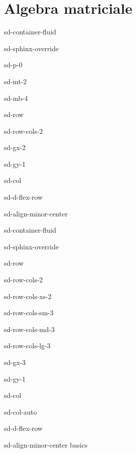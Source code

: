 \documentclass[letterpaper,10pt,italian]{jupyterBook}
\begin{document}
\chapter{Algebra matriciale}
\label{\detokenize{ch/algebra/matrix-algebra:algebra-matriciale}}\label{\detokenize{ch/algebra/matrix-algebra:math-hs-algebra-matrix}}\label{\detokenize{ch/algebra/matrix-algebra::doc}}
\sphinxstepscope

\begin{sphinxuseclass}{sd-container-fluid}
\begin{sphinxuseclass}{sd-sphinx-override}
\begin{sphinxuseclass}{sd-p-0}
\begin{sphinxuseclass}{sd-mt-2}
\begin{sphinxuseclass}{sd-mb-4}
\begin{sphinxuseclass}{sd-row}
\begin{sphinxuseclass}{sd-row-cols-2}
\begin{sphinxuseclass}{sd-gx-2}
\begin{sphinxuseclass}{sd-gy-1}
\begin{sphinxuseclass}{sd-col}
\begin{sphinxuseclass}{sd-d-flex-row}
\begin{sphinxuseclass}{sd-align-minor-center}
\begin{sphinxuseclass}{sd-container-fluid}
\begin{sphinxuseclass}{sd-sphinx-override}
\begin{sphinxuseclass}{sd-row}
\begin{sphinxuseclass}{sd-row-cols-2}
\begin{sphinxuseclass}{sd-row-cols-xs-2}
\begin{sphinxuseclass}{sd-row-cols-sm-3}
\begin{sphinxuseclass}{sd-row-cols-md-3}
\begin{sphinxuseclass}{sd-row-cols-lg-3}
\begin{sphinxuseclass}{sd-gx-3}
\begin{sphinxuseclass}{sd-gy-1}
\begin{sphinxuseclass}{sd-col}
\begin{sphinxuseclass}{sd-col-auto}
\begin{sphinxuseclass}{sd-d-flex-row}
\begin{sphinxuseclass}{sd-align-minor-center}
\sphinxAtStartPar
basics


\end{sphinxuseclass}
\end{sphinxuseclass}
\end{sphinxuseclass}
\end{sphinxuseclass}
\end{sphinxuseclass}
\end{sphinxuseclass}
\end{sphinxuseclass}
\end{sphinxuseclass}
\end{sphinxuseclass}
\end{sphinxuseclass}
\end{sphinxuseclass}
\end{sphinxuseclass}
\end{sphinxuseclass}
\end{sphinxuseclass}
\end{sphinxuseclass}
\end{sphinxuseclass}
\end{sphinxuseclass}
\end{sphinxuseclass}
\end{sphinxuseclass}
\end{sphinxuseclass}
\end{sphinxuseclass}
\end{sphinxuseclass}
\end{sphinxuseclass}
\end{sphinxuseclass}
\end{sphinxuseclass}
\end{sphinxuseclass}
\end{document}
